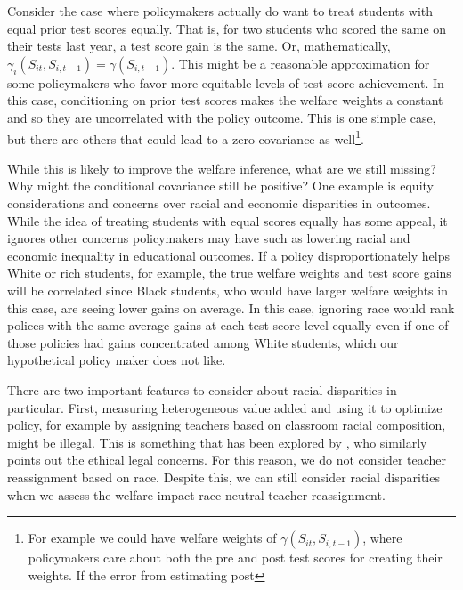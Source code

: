 \documentclass[12pt]{article}
\theoremstyle{definition}
\theoremstyle{definition}
\theoremstyle{definition}
\theoremstyle{definition}
\begin{document}
    Consider the case where policymakers actually do want to treat students with equal prior test scores equally. That is, for two students who scored the same on their tests last year, a test score gain is the same. Or, mathematically, $\gamma_i(S_{it}, S_{i,t-1}) = \gamma(S_{i,t-1})$. This might be a reasonable approximation for some policymakers who favor more equitable levels of test-score achievement. In this case, conditioning on prior test scores makes the welfare weights a constant and so they are uncorrelated with the policy outcome. This is one simple case, but there are others that could lead to a zero covariance as well\footnote{For example we could have welfare weights of $\gamma(S_{it}, S_{i,t-1})$, where policymakers care about both the pre and post test scores for creating their weights. If the error from estimating post }.  
    
    While this is likely to improve the welfare inference, what are we still missing? Why might the conditional covariance still be positive? One example is equity considerations and concerns over racial and economic disparities in outcomes. While the idea of treating students with equal scores equally has some appeal, it ignores other concerns policymakers may have such as lowering racial and economic inequality in educational outcomes. If a policy disproportionately helps White or rich students, for example, the true welfare weights and test score gains will be correlated since Black students, who would have larger welfare weights in this case, are seeing lower gains on average. In this case, ignoring race would rank polices with the same average gains at each test score level equally even if one of those policies had gains concentrated among White students, which our hypothetical policy maker does not like.

    There are two important features to consider about racial disparities in particular. First, measuring heterogeneous value added and using it to optimize policy, for example by assigning teachers based on classroom racial composition, might be illegal. This is something that has been explored by \citet{Delgado2020}, who similarly points out the ethical legal concerns. For this reason, we do not consider teacher reassignment based on race. Despite this, we can still consider racial disparities when we assess the welfare impact race neutral teacher reassignment. 
    
\end{document}

